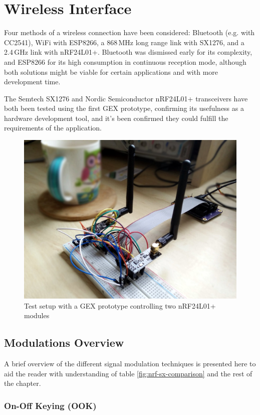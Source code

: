 \chapter{Wireless Interface} \label{sec:wireless}

Four methods of a wireless connection have been considered: Bluetooth (e.g. with CC2541), WiFi with ESP8266, a 868\,MHz long range link with SX1276, and a 2.4\,GHz link with nRF24L01+. Bluetooth was dismissed early for its complexity, and ESP8266 for its high consumption in continuous reception mode, although both solutions might be viable for certain applications and with more development time. 

The Semtech SX1276 and Nordic Semiconductor nRF24L01+ transceivers have both been tested using the first GEX prototype, confirming its usefulness as a hardware development tool, and it's been confirmed they could fulfill the requirements of the application.

\begin{figure}[h]
	\centering
	\includegraphics[width=.7\textwidth]{img/nrf-testing.jpg}
	\caption{Test setup with a GEX prototype controlling two nRF24L01+ modules}
\end{figure}

\section{Modulations Overview}

A brief overview of the different signal modulation techniques is presented here to aid the reader with understanding of table \ref{fig:nrf-sx-comparison} and the rest of the chapter.

\subsection{On-Off Keying (OOK)}

